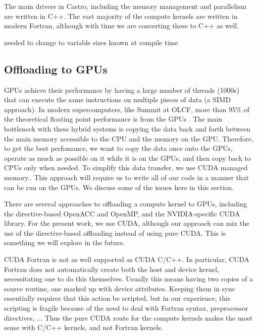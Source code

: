 \documentclass[twocolumn,times]{aastex62}
\newcommand{\MarginPar}[1]{\marginpar{\vskip-\baselineskip\raggedright\tiny\sffamily\hrule\smallskip{\color{red}#1}\par\smallskip\hrule}}
\begin{document}
The main drivers in Castro, including the memory management and
parallelism are written in C++.  The vast majority of the compute
kernels are written in modern Fortran, although with time we are
converting these to C++ as well.

needed to change to variable sizes known at compile time

\subsection{Offloading to GPUs}

GPUs achieve their performance by having a large number of threads
(1000s) that can execute the same instructions on multiple pieces of
data (a SIMD approach). \MarginPar{Max will not like this desciption.}
In modern supercomputers, like Summit at OLCF, more than 95\% of the
theoretical floating point performance is from the
GPUs \MarginPar{cite?}.  The main bottleneck with these hybrid systems
is copying the data back and forth between the main memory accessible
to the CPU and the memory on the GPU.  Therefore, to get the best
perfomance, we want to copy the data once onto the GPUs, operate as
much as possible on it while it is on the GPUs, and then copy back to
CPUs only when needed.  To simplify this data transfer, we use CUDA
managed memory.\MarginPar{more here}.  This approach will require us
to write all of our code in a manner that can be run on the GPUs.  We
discuss some of the issues here in this section.

There are several approaches to offloading a compute kernel to GPUs,
including the directive-based OpenACC and OpenMP, and the
NVIDIA-specific CUDA library.  For the present work, we use CUDA,
although our approach can mix the use of the directive-based
offloading instead of using pure CUDA.  This is something we will
explore in the future.  

CUDA Fortran is not as well supported as CUDA C/C++.  In particular,
CUDA Fortran does not automatically create both the host and device
kernel, necessitating one to do this themselves.  Usually this means
having two copies of a source routine, one marked up with device
attributes.  Keeping them in sync essentially requires that this
action be scripted, but in our experience, this scripting is fragile
because of the need to deal with Fortran syntax, preprocessor
directives, ...  Thus the pure CUDA route for the compute kernels
makes the most sense with C/C++ kernels, and not Fortran kernels.
\end{document}
